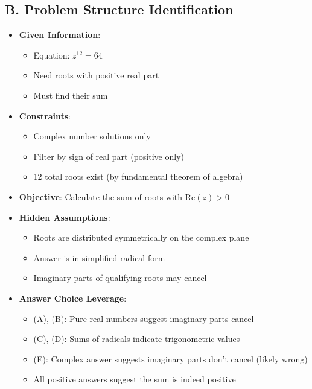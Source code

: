 \documentclass[11pt]{article}
\begin{document}
\begin{problemconfigbox}
\subsection*{B. Problem Structure Identification}
\begin{itemize}[leftmargin=*]
    \item \textbf{Given Information}: 
    \begin{itemize}
        \item Equation: $z^{12}=64$
        \item Need roots with positive real part
        \item Must find their sum
    \end{itemize}
    \item \textbf{Constraints}: 
    \begin{itemize}
        \item Complex number solutions only
        \item Filter by sign of real part (positive only)
        \item 12 total roots exist (by fundamental theorem of algebra)
    \end{itemize}
    \item \textbf{Objective}: Calculate the sum of roots with $\text{Re}(z) > 0$
    \item \textbf{Hidden Assumptions}: 
    \begin{itemize}
        \item Roots are distributed symmetrically on the complex plane
        \item Answer is in simplified radical form
        \item Imaginary parts of qualifying roots may cancel
    \end{itemize}
    \item \textbf{Answer Choice Leverage}: 
    \begin{itemize}
        \item (A), (B): Pure real numbers suggest imaginary parts cancel
        \item (C), (D): Sums of radicals indicate trigonometric values
        \item (E): Complex answer suggests imaginary parts don't cancel (likely wrong)
        \item All positive answers suggest the sum is indeed positive
    \end{itemize}
\end{itemize}


\end{problemconfigbox}
\end{document}
